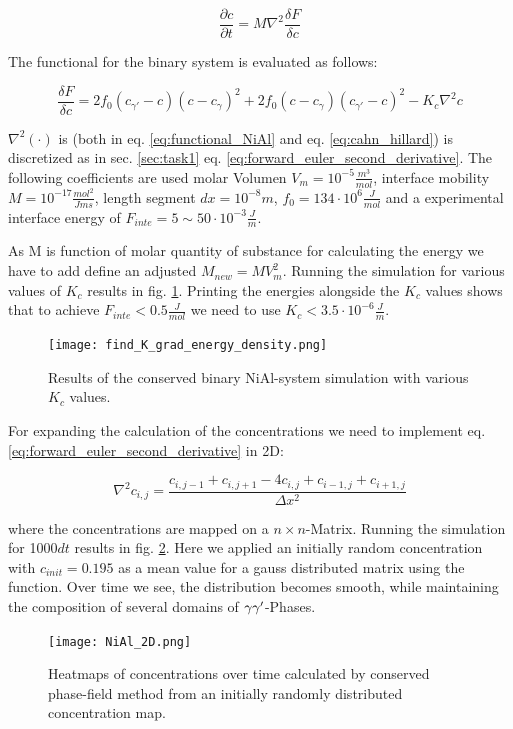 \begin{equation}
	\frac{ \partial c}{ \partial t} = M \nabla^{2} \frac{\delta F}{\delta c} \label{eq:cahn_hillard}
\end{equation} 

The functional for the binary system is evaluated as follows:

\begin{equation}
	\frac{\delta F}{\delta c} = 2 f_{0}(c_{\gamma '} - c )(c - c_{\gamma})^2 + 2 f_{0} (c - c_{\gamma})(c_{\gamma '} - c )^{2} - K_{c} \nabla^{2} c  \label{eq:functional_NiAl}
\end{equation}
		
\(\nabla^{2}(\cdot)\) is (both in eq. \ref{eq:functional_NiAl} and eq. \ref{eq:cahn_hillard}) is discretized as in sec. \ref{sec:task1} eq. \ref{eq:forward_euler_second_derivative}.  The following coefficients are used molar Volumen \(V_{m} = 10^{-5} \frac{m^{3}}{mol}\), interface mobility \(M = 10^{-17} \frac{mol^{2}}{J m s}\), length segment \(dx = 10^{-8} m\), \(f_{0} = 134 \cdot 10^{6} \frac{J}{mol}\) and a experimental interface energy of \( F_{inte} = 5 \sim 50 \cdot 10^{-3} \frac{J}{m}\). 

As M is function of molar quantity of substance for calculating the energy we have to add define an adjusted \( M_{new} = M V_{m}^{2}\). Running the simulation for various values of \(K_{c}\) results in fig. \ref{fig:vary_K}. Printing the energies alongside the \(K_{c}\) values shows that to achieve \(F_{inte} < 0.5 \frac{J}{mol}\) we need to use \(K_{c} < 3.5 \cdot 10^{-6} \frac{J}{m}\).

\begin{figure}[htb]
	\texttt{[image: find\_K\_grad\_energy\_density.png]} 
	\caption{Results of the conserved binary NiAl-system simulation with various \(K_{c}\) values.}
	\label{fig:vary_K}
\end{figure}

For expanding the calculation of the concentrations we need to implement eq. \ref{eq:forward_euler_second_derivative} in 2D:

\begin{equation}
	\nabla^{2} c_{i,j} = \frac{c_{i,j-1} + c_{i,j+1} - 4c_{i, j} + c_{i-1, j} + c_{i+1, j}}{\Delta x^{2}} 
\end{equation}

where the concentrations are mapped on a \(n \times n\)-Matrix. Running the simulation for 1000\(dt\) results in fig. \ref{fig:NiAl_2D_heatmaps}. Here we applied an initially random concentration with \(c_{init} = 0.195\) as a mean value for a gauss distributed matrix using the  function. Over time we see, the distribution becomes smooth, while maintaining the composition of several domains of \(\gamma \\ \gamma '\)-Phases.

\begin{figure}
	\texttt{[image: NiAl\_2D.png]} 
	\caption{Heatmaps of concentrations over time calculated by conserved phase-field method from an initially randomly distributed concentration map.}
	\label{fig:NiAl_2D_heatmaps}
\end{figure}


\printbibliography




